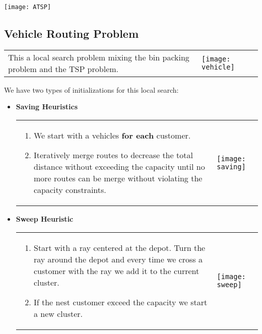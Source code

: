 \begin{center}
    \texttt{[image: ATSP]}
\end{center}


\subsection{Vehicle Routing Problem}

\begin{tabular}{m{9cm}m{7cm}}
    This a local search problem mixing the bin packing problem and the TSP problem.
    &
    \texttt{[image: vehicle]}
\end{tabular}

We have two types of initializations for this local search:
\begin{itemize}
    \item \textbf{Saving Heuristics}

        \begin{tabular}{m{6cm}m{6cm}}
            \begin{enumerate}
                \item We start with a vehicles \textbf{for each}
                    customer.

                \item Iteratively merge routes to
                    decrease the total distance without exceeding the
                    capacity until no more routes can be
                    merge without violating the capacity constraints.
            \end{enumerate}
            & 
            \texttt{[image: saving]}
        \end{tabular}

    \item \textbf{Sweep Heuristic} 

        \begin{tabular}{m{6cm}m{6cm}}
            \begin{enumerate}
                \item  Start with a ray centered at the depot. Turn the
                    ray around the depot and every time we cross a
                    customer with the ray we add it to the current
                    cluster.
                \item If the nest customer exceed the capacity we start a new
                    cluster.
            \end{enumerate}
            & 
            \texttt{[image: sweep]}
        \end{tabular}
\end{itemize}

